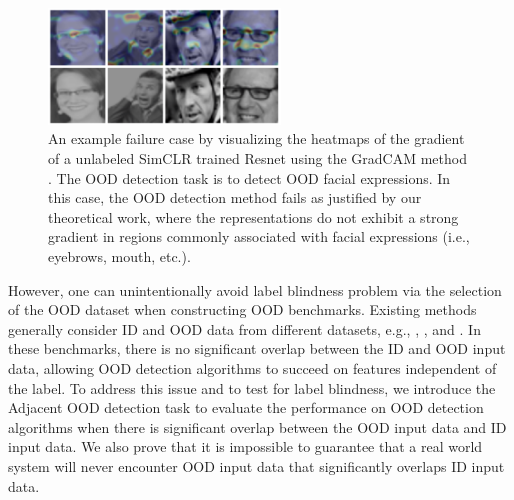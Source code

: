 \documentclass{article} %
\theoremstyle{plain}
\theoremstyle{definition}
\theoremstyle{remark}
\begin{document}
\begin{figure}
\vspace{-4mm}
    \includegraphics[width=0.55\textwidth]{../images/gradcam_example_faces.png} %
    \caption{An example failure case by visualizing the heatmaps of the gradient of a unlabeled SimCLR trained Resnet \citep{chen2020simple} using the GradCAM method \citep{selvaraju2017grad}. The OOD detection task is to detect OOD facial expressions. In this case, the OOD detection method fails as justified by our theoretical work, where the representations do not exhibit a strong gradient in regions commonly associated with facial expressions (i.e., eyebrows, mouth, etc.).}
    \label{fig:grad}
 \vspace{-4mm}   
\end{figure}
\setlength{\belowcaptionskip}{0pt}

However, one can unintentionally avoid label blindness problem via the selection of the OOD dataset when constructing OOD benchmarks. Existing methods generally consider ID and OOD data from different datasets, e.g., \citep{fort2021exploring}, \citep{sehwag2021ssd}, and \citep{hendrycks2019using}. In these benchmarks, there is no significant overlap between the ID and OOD input data, allowing OOD detection algorithms to succeed on features independent of the label. To address this issue and to test for label blindness, we introduce the Adjacent OOD detection task to evaluate the performance on OOD detection algorithms when there is significant overlap between the OOD input data and ID input data. We also prove that it is impossible to guarantee that a real world system will never encounter OOD input data that significantly overlaps ID input data. 
\end{document}
